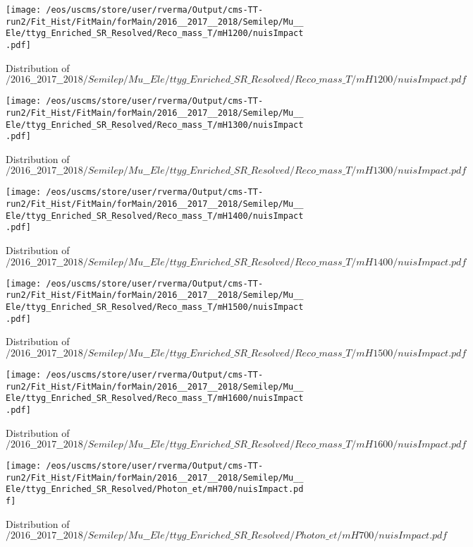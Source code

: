 \begin{figure}
\centering
\texttt{[image: /eos/uscms/store/user/rverma/Output/cms-TT-run2/Fit\_Hist/FitMain/forMain/2016\_\_2017\_\_2018/Semilep/Mu\_\_Ele/ttyg\_Enriched\_SR\_Resolved/Reco\_mass\_T/mH1200/nuisImpact.pdf]}
\caption{Distribution of $/2016\_\_2017\_\_2018/Semilep/Mu\_\_Ele/ttyg\_Enriched\_SR\_Resolved/Reco\_mass\_T/mH1200/nuisImpact.pdf$}
\end{figure}

\begin{figure}
\centering
\texttt{[image: /eos/uscms/store/user/rverma/Output/cms-TT-run2/Fit\_Hist/FitMain/forMain/2016\_\_2017\_\_2018/Semilep/Mu\_\_Ele/ttyg\_Enriched\_SR\_Resolved/Reco\_mass\_T/mH1300/nuisImpact.pdf]}
\caption{Distribution of $/2016\_\_2017\_\_2018/Semilep/Mu\_\_Ele/ttyg\_Enriched\_SR\_Resolved/Reco\_mass\_T/mH1300/nuisImpact.pdf$}
\end{figure}

\begin{figure}
\centering
\texttt{[image: /eos/uscms/store/user/rverma/Output/cms-TT-run2/Fit\_Hist/FitMain/forMain/2016\_\_2017\_\_2018/Semilep/Mu\_\_Ele/ttyg\_Enriched\_SR\_Resolved/Reco\_mass\_T/mH1400/nuisImpact.pdf]}
\caption{Distribution of $/2016\_\_2017\_\_2018/Semilep/Mu\_\_Ele/ttyg\_Enriched\_SR\_Resolved/Reco\_mass\_T/mH1400/nuisImpact.pdf$}
\end{figure}

\begin{figure}
\centering
\texttt{[image: /eos/uscms/store/user/rverma/Output/cms-TT-run2/Fit\_Hist/FitMain/forMain/2016\_\_2017\_\_2018/Semilep/Mu\_\_Ele/ttyg\_Enriched\_SR\_Resolved/Reco\_mass\_T/mH1500/nuisImpact.pdf]}
\caption{Distribution of $/2016\_\_2017\_\_2018/Semilep/Mu\_\_Ele/ttyg\_Enriched\_SR\_Resolved/Reco\_mass\_T/mH1500/nuisImpact.pdf$}
\end{figure}

\begin{figure}
\centering
\texttt{[image: /eos/uscms/store/user/rverma/Output/cms-TT-run2/Fit\_Hist/FitMain/forMain/2016\_\_2017\_\_2018/Semilep/Mu\_\_Ele/ttyg\_Enriched\_SR\_Resolved/Reco\_mass\_T/mH1600/nuisImpact.pdf]}
\caption{Distribution of $/2016\_\_2017\_\_2018/Semilep/Mu\_\_Ele/ttyg\_Enriched\_SR\_Resolved/Reco\_mass\_T/mH1600/nuisImpact.pdf$}
\end{figure}

\begin{figure}
\centering
\texttt{[image: /eos/uscms/store/user/rverma/Output/cms-TT-run2/Fit\_Hist/FitMain/forMain/2016\_\_2017\_\_2018/Semilep/Mu\_\_Ele/ttyg\_Enriched\_SR\_Resolved/Photon\_et/mH700/nuisImpact.pdf]}
\caption{Distribution of $/2016\_\_2017\_\_2018/Semilep/Mu\_\_Ele/ttyg\_Enriched\_SR\_Resolved/Photon\_et/mH700/nuisImpact.pdf$}
\end{figure}

